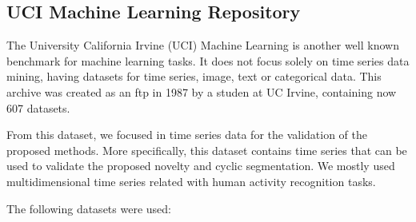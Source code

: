 \subsection{UCI Machine Learning Repository}

The University California Irvine (UCI) Machine Learning is another well known benchmark for machine learning tasks. It does not focus solely on time series data mining, having datasets for time series, image, text or categorical data. This archive was created as an ftp in 1987 by a studen at UC Irvine, containing now 607 datasets. 
\par
From this dataset, we focused in time series data for the validation of the proposed methods. More specifically, this dataset contains time series that can be used to validate the proposed novelty and cyclic segmentation. We mostly used multidimensional time series related with human activity recognition tasks.
\par
The following datasets were used:
